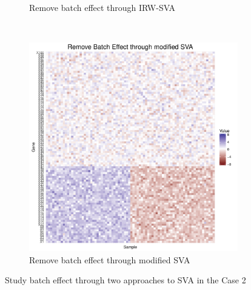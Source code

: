 \documentclass[11pt]{article}
\begin{document}
\begin{figure}[h!]
\begin{subfigure}[b]{0.3\textwidth}
        \caption{Remove batch effect through IRW-SVA}
    \end{subfigure}  %
~
    \begin{subfigure}[b]{0.3\textwidth}
        \centering
        \includegraphics[width = \textwidth]{figures/new_sva2.pdf}
        \caption{Remove batch effect through modified SVA}
    \end{subfigure}    
    \caption{Study batch effect through two approaches to SVA in the Case 2}
    \label{fig:sva2}
\end{figure}
\end{document}
